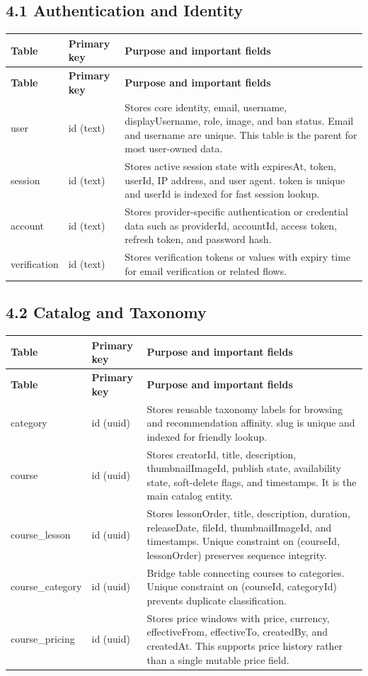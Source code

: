 \documentclass[11pt,a4paper]{article}
\begin{document}
\subsection*{4.1 Authentication and Identity}
\begin{longtable}{L{2.6cm}L{3.0cm}L{9.0cm}}
\toprule
\textbf{Table} & \textbf{Primary key} & \textbf{Purpose and important fields} \\
\midrule
\endfirsthead
\toprule
\textbf{Table} & \textbf{Primary key} & \textbf{Purpose and important fields} \\
\midrule
\endhead
\bottomrule
\endfoot
user & id (text) & Stores core identity, email, username, displayUsername, role, image, and ban status. Email and username are unique. This table is the parent for most user-owned data. \\
session & id (text) & Stores active session state with expiresAt, token, userId, IP address, and user agent. token is unique and userId is indexed for fast session lookup. \\
account & id (text) & Stores provider-specific authentication or credential data such as providerId, accountId, access token, refresh token, and password hash. \\
verification & id (text) & Stores verification tokens or values with expiry time for email verification or related flows. \\
\end{longtable}

\subsection*{4.2 Catalog and Taxonomy}
\begin{longtable}{L{2.6cm}L{3.0cm}L{9.0cm}}
\toprule
\textbf{Table} & \textbf{Primary key} & \textbf{Purpose and important fields} \\
\midrule
\endfirsthead
\toprule
\textbf{Table} & \textbf{Primary key} & \textbf{Purpose and important fields} \\
\midrule
\endhead
\bottomrule
\endfoot
category & id (uuid) & Stores reusable taxonomy labels for browsing and recommendation affinity. slug is unique and indexed for friendly lookup. \\
course & id (uuid) & Stores creatorId, title, description, thumbnailImageId, publish state, availability state, soft-delete flags, and timestamps. It is the main catalog entity. \\
course\_lesson & id (uuid) & Stores lessonOrder, title, description, duration, releaseDate, fileId, thumbnailImageId, and timestamps. Unique constraint on (courseId, lessonOrder) preserves sequence integrity. \\
course\_category & id (uuid) & Bridge table connecting courses to categories. Unique constraint on (courseId, categoryId) prevents duplicate classification. \\
course\_pricing & id (uuid) & Stores price windows with price, currency, effectiveFrom, effectiveTo, createdBy, and createdAt. This supports price history rather than a single mutable price field. \\
\end{longtable}
\end{document}
